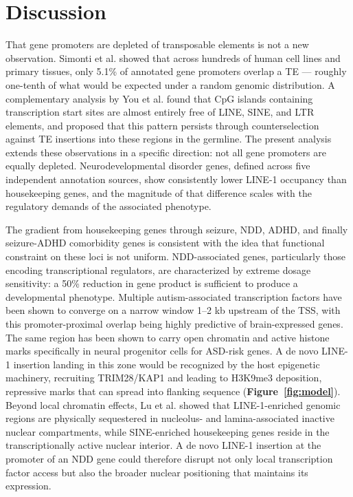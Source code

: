 \documentclass[11pt, a4paper]{article}
\newcommand{\Fig}[1]{\textbf{Figure~\ref{#1}}}
\begin{document}
\section*{Discussion}

That gene promoters are depleted of transposable elements is
not a new observation. Simonti et al. showed that across
hundreds of human cell lines and primary tissues, only 5.1\%
of annotated gene promoters overlap a TE --- roughly one-tenth
of what would be expected under a random genomic
distribution\cite{simonti2017}. A complementary analysis by
You et al. found that CpG islands containing transcription
start sites are almost entirely free of LINE, SINE, and LTR
elements, and proposed that this pattern persists through
counterselection against TE insertions into these regions in
the germline\cite{you2025}. The present analysis extends
these observations in a specific direction: not all gene
promoters are equally depleted. Neurodevelopmental disorder
genes, defined across five independent annotation sources,
show consistently lower LINE-1 occupancy than housekeeping
genes, and the magnitude of that difference scales with the
regulatory demands of the associated phenotype.

The gradient from housekeeping genes through seizure, NDD,
ADHD, and finally seizure-ADHD comorbidity genes is
consistent with the idea that functional constraint on these
loci is not uniform. NDD-associated genes, particularly
those encoding transcriptional regulators, are characterized
by extreme dosage sensitivity: a 50\% reduction in gene
product is sufficient to produce a developmental
phenotype\cite{zug2022}. Multiple autism-associated
transcription factors have been shown to converge on a
narrow window 1--2 kb upstream of the TSS, with this
promoter-proximal overlap being highly predictive of
brain-expressed genes\cite{darbandi2024}. The same region
has been shown to carry open chromatin and active histone
marks specifically in neural progenitor cells for ASD-risk
genes\cite{koesterich2023}. A de novo LINE-1 insertion landing in this zone would be recognized by the host epigenetic machinery, recruiting TRIM28/KAP1 and leading to H3K9me3 deposition, repressive marks that can spread into flanking sequence\cite{jonsson2019} (\Fig{fig:model}). Beyond local chromatin effects, Lu et al. showed that LINE-1-enriched genomic regions are
physically sequestered in nucleolus- and lamina-associated
inactive nuclear compartments, while SINE-enriched
housekeeping genes reside in the transcriptionally active
nuclear interior\cite{lu2020}. A de novo LINE-1 insertion
at the promoter of an NDD gene could therefore disrupt not
only local transcription factor access but also the broader
nuclear positioning that maintains its expression.
\end{document}
